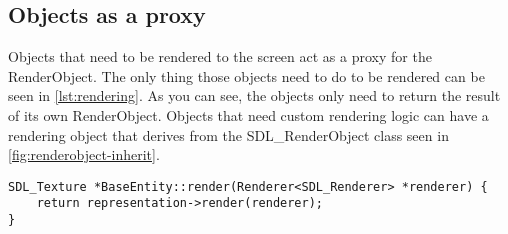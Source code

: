 \subsection{Objects as a proxy}
\label{sec:rendering-proxy}

Objects that need to be rendered to the screen act as a proxy for the 
RenderObject. The only thing those objects need to do to be rendered can be 
seen in \cref{lst:rendering}. As you can see, the objects only need to return 
the result of its own RenderObject. Objects that need custom rendering logic 
can have a rendering object that derives from the SDL\_RenderObject class seen 
in \cref{fig:renderobject-inherit}.
\\
\begin{lstlisting}[caption={Rendering proxy.},label={lst:rendering}]
SDL_Texture *BaseEntity::render(Renderer<SDL_Renderer> *renderer) {
    return representation->render(renderer);
}
\end{lstlisting}
